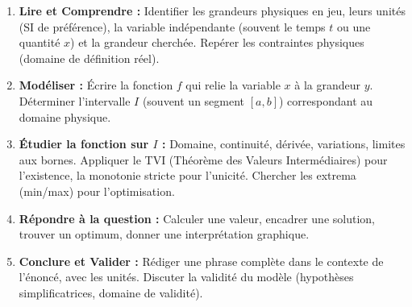 \documentclass[11pt]{article}
\begin{document}
\begin{methode}
\begin{enumerate}
    \item \textbf{Lire et Comprendre :} Identifier les grandeurs physiques en jeu, leurs unités (SI de préférence), la variable indépendante (souvent le temps $t$ ou une quantité $x$) et la grandeur cherchée. Repérer les contraintes physiques (domaine de définition réel).
    \item \textbf{Modéliser :} Écrire la fonction $f$ qui relie la variable $x$ à la grandeur $y$. Déterminer l'intervalle $I$ (souvent un segment $[a,b]$) correspondant au domaine physique.
    \item \textbf{Étudier la fonction sur $I$ :} Domaine, continuité, dérivée, variations, limites aux bornes. Appliquer le TVI (Théorème des Valeurs Intermédiaires) pour l'existence, la monotonie stricte pour l'unicité. Chercher les extrema (min/max) pour l'optimisation.
    \item \textbf{Répondre à la question :} Calculer une valeur, encadrer une solution, trouver un optimum, donner une interprétation graphique.
    \item \textbf{Conclure et Valider :} Rédiger une phrase complète dans le contexte de l'énoncé, avec les unités. Discuter la validité du modèle (hypothèses simplificatrices, domaine de validité).
\end{enumerate}
\end{methode}
\end{document}
